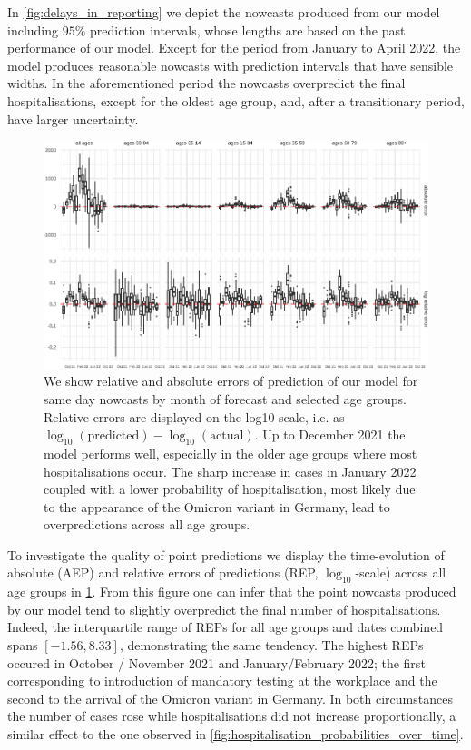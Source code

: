 In \cref{fig:delays_in_reporting} we depict the nowcasts produced
from our model including \(95\%\) prediction intervals, whose lengths
are based on the past performance of our model. Except for the period
from January to April 2022, the model produces reasonable nowcasts with
prediction intervals that have sensible widths. In the aforementioned
period the nowcasts overpredict the final hospitalisations, except for
the oldest age group, and, after a transitionary period, have larger
uncertainty.

\begin{figure}

    {\centering \includegraphics[width=\textwidth]{figures_tentative/REP-1} 

}

\caption{
We show relative and absolute errors of prediction of our model for same day nowcasts by month of forecast and selected age groups. 
Relative errors are displayed on the log10 scale, i.e. as $\log_{10} (\text{predicted}) - \log_{10} (\text{actual})$.
Up to December 2021 the model performs well, especially in the older age groups where most hospitalisations occur. 
The sharp increase in cases in January 2022 coupled with a lower probability of hospitalisation, most likely due to the appearance of the Omicron variant in Germany, lead to overpredictions across all age groups.
}\label{fig:REP}
\end{figure}

To investigate the quality of point predictions we display the
time-evolution of absolute (AEP) and relative errors of predictions
(REP, \(\log_{10}\)-scale) across all age groups in 
\cref{fig:REP}. From this figure one can infer that the point nowcasts
produced by our model tend to slightly overpredict the final number of
hospitalisations. Indeed, the interquartile range of REPs for all age
groups and dates combined spans \([-1.56, 8.33]\), demonstrating the
same tendency. The highest REPs occured in October / November 2021 and
January/February 2022; the first corresponding to introduction of
mandatory testing at the workplace and the second to the arrival of the
Omicron variant in Germany. In both circumstances the number of cases
rose while hospitalisations did not increase proportionally, a similar
effect to the one observed in 
\cref{fig:hospitalisation_probabilities_over_time}.

